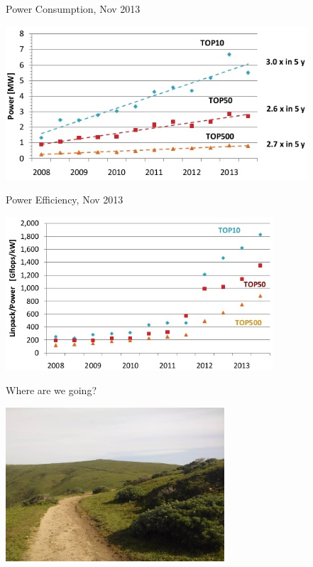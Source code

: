 \documentclass[xcolor=x11names,compress]{beamer}
\renewcommand{\(}{\begin{columns}}
\renewcommand{\)}{\end{columns}}
\newcommand{\<}[1]{\begin{column}{#1}}
\renewcommand{\>}{\end{column}}
\begin{document}
\begin{frame}{Power Consumption, Nov 2013}

\begin{center}
\includegraphics[height=2.25in]{Top500-power}
\end{center}

\end{frame}

\begin{frame}{Power Efficiency, Nov 2013}

\begin{center}
\includegraphics[height=2.25in]{Top500-efficiency}
\end{center}

\end{frame}


\begin{frame}{Where are we going?}
\begin{center}
\includegraphics[height=2.25in]{road}
\end{center}
\end{frame}
\end{document}
